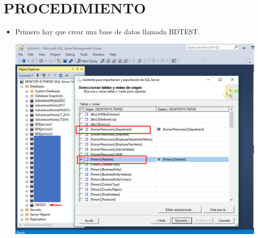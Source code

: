 \section{PROCEDIMIENTO} 

\begin{itemize}
\subsection{ACTIVIDAD 01}
	\subsubsection{Importación de Datos usando el Wizard - SQL MANAGMENT}

	\item Primero hay que crear una base de datos llamada BDTEST.

	\begin{center}
	\includegraphics[width=14cm]{./Imagenes/tarea1}
	\end{center}
	

\end{itemize}

